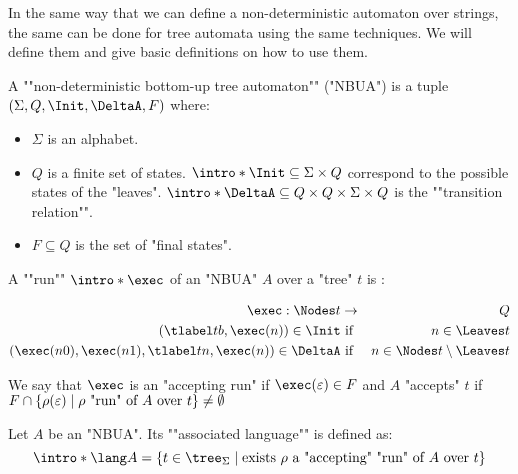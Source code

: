 \documentclass[a4paper,UKenglish,cleveref, autoref, thm-restate]{lipics-v2021}
\begin{document}
In the same way that we can define a non-deterministic automaton over strings, the same can be done for
tree automata using the same techniques. We will define them and give basic definitions on how to use them.

\begin{definition}
	\AP A ""non-deterministic bottom-up tree automaton"" (\reintro*"NBUA") is a tuple
	$(\Sigma, Q, \Init, \DeltaA, F)$ where:
	\begin{itemize}
		\item $\Sigma$ is an alphabet.
		\item $Q$ is a finite set of states.
		      \itemAP $\intro*\Init \subseteq \Sigma \times Q$ correspond to the possible states of the "leaves".
		      \itemAP $\intro*\DeltaA \subseteq Q \times Q \times \Sigma \times Q$ is the ""transition relation"".
		\item $F \subseteq Q$ is the set of "final states".
	\end{itemize}
\end{definition}

\begin{definition}
	\AP A ""run"" $\intro* \exec$ of an "NBUA" $A$ over a "tree" $t$ is :

	\begin{eqnarray*}
		\exec : \Nodes t  &\to& Q \\
		(\tlabel t b,  \exec (n) ) \in \Init &\text{ if }& n \in \Leaves t \\
		(\exec (n0), \exec (n1), \tlabel t n, \exec (n)) \in \DeltaA &\text{ if }& n \in \Nodes t \setminus \Leaves t
	\end{eqnarray*}

	We say that $\exec$ is an "accepting run" if $\exec (\varepsilon) \in F$ and $A$ "accepts" $t$ if
	$F \cap \left\{\rho(\varepsilon) \mid \text{$\rho$ "run" of~$A$ over~$t$}\right\} \neq \emptyset$
\end{definition}


\begin{definition}
	\AP Let $A$ be an "NBUA". Its ""associated language"" is defined as:
	\[\intro* \lang A = \setdef {t \in \tree_{\Sigma}} {\text{exists $\rho$ a "accepting" "run" of $A$ over $t$}} \]
\end{definition}
\end{document}
